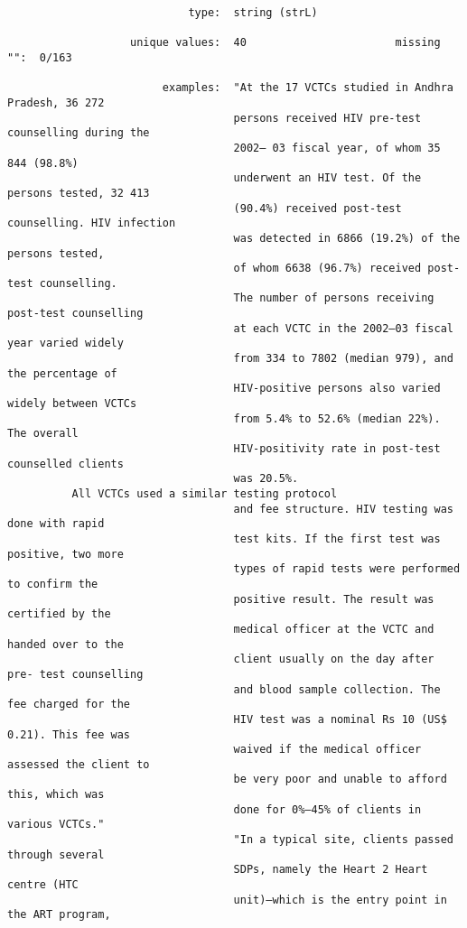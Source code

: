 \documentclass{article}
\begin{document}
\begin{verbatim}
                            type:  string (strL)
          
                   unique values:  40                       missing "":  0/163
          
                        examples:  "At the 17 VCTCs studied in Andhra Pradesh, 36 272
                                   persons received HIV pre-test counselling during the
                                   2002– 03 fiscal year, of whom 35 844 (98.8%)
                                   underwent an HIV test. Of the persons tested, 32 413
                                   (90.4%) received post-test counselling. HIV infection
                                   was detected in 6866 (19.2%) of the persons tested,
                                   of whom 6638 (96.7%) received post-test counselling.
                                   The number of persons receiving post-test counselling
                                   at each VCTC in the 2002–03 fiscal year varied widely
                                   from 334 to 7802 (median 979), and the percentage of
                                   HIV-positive persons also varied widely between VCTCs
                                   from 5.4% to 52.6% (median 22%). The overall
                                   HIV-positivity rate in post-test counselled clients
                                   was 20.5%.
          All VCTCs used a similar testing protocol
                                   and fee structure. HIV testing was done with rapid
                                   test kits. If the first test was positive, two more
                                   types of rapid tests were performed to confirm the
                                   positive result. The result was certified by the
                                   medical officer at the VCTC and handed over to the
                                   client usually on the day after pre- test counselling
                                   and blood sample collection. The fee charged for the
                                   HIV test was a nominal Rs 10 (US$ 0.21). This fee was
                                   waived if the medical officer assessed the client to
                                   be very poor and unable to afford this, which was
                                   done for 0%–45% of clients in various VCTCs."
                                   "In a typical site, clients passed through several
                                   SDPs, namely the Heart 2 Heart centre (HTC
                                   unit)—which is the entry point in the ART program,

\end{verbatim}
\end{document}
